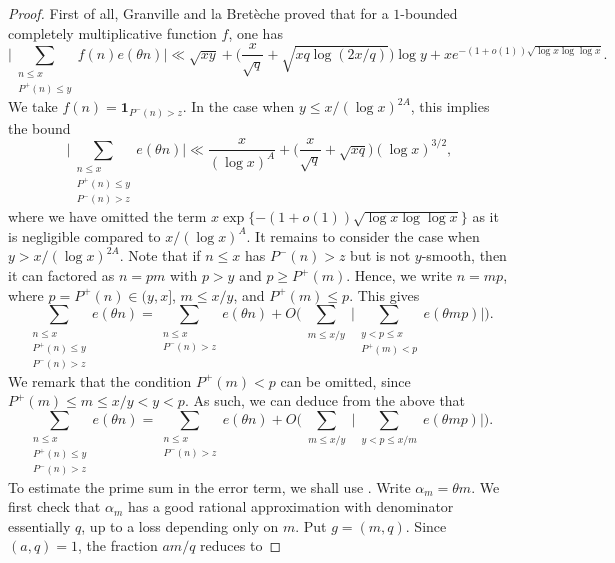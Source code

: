 \documentclass[12pt]{amsart}
\renewcommand{\le}{\leqslant}
\renewcommand{\leq}{\leqslant}
\renewcommand{\ge}{\geqslant}
\numberwithin{equation}{section}
\theoremstyle{plain}
\theoremstyle{definition}
\begin{document}
	\begin{proof}
		First of all, Granville and la Bret\`eche \cite[Equation 10.1]{granville breteche exp sums} proved that for a $1$-bounded completely multiplicative function $f$, one has
		$$\bigg|\sum_{\substack{n \leq x \\ P^+(n) \leq y}} f(n)e(\theta n)\bigg| \ll \sqrt{xy} + \bigg(\frac{x}{\sqrt{q}} + \sqrt{xq \log(2x/q)}\bigg)\log y + x e^{-(1+o(1))\sqrt{\log x  \log \log x}}.$$
		We take $f(n) = \bm{1}_{P^-(n) > z}$. In the case when $y \leq x/(\log x)^{2A}$, this implies the bound
		$$\bigg|\sum_{\substack{n \leq x \\ P^+(n) \leq y \\ P^-(n) > z}}e(\theta n)\bigg| \ll \frac{x}{(\log x)^{A}} + \bigg(\frac{x}{\sqrt{q}} + \sqrt{xq}\bigg)(\log x)^{3/2},$$
		where we have omitted the term $x\exp \{ -(1+o(1))\sqrt{\log x \log \log x}\}$ as it is negligible compared to $x/(\log x)^{A}$. It remains to consider the case when $y > x/(\log x)^{2A}$. Note that if $n\le x$ has $P^-(n)>z$ but is not $y$-smooth, then it can factored as $n=pm$ with $p>y$ and $p\ge P^+(m)$. Hence, we write $n = mp$, where $p = P^+(n) \in (y,x]$, $m \leq x/y$, and $P^+(m) \leq p$. This gives
		$$\sum_{\substack{n \leq x \\ P^+(n) \leq y \\ P^-(n) > z}}e(\theta n) =\sum_{\substack{n \leq x \\  P^-(n) > z}} e(\theta n) + O\bigg( \sum_{\substack{m \leq x/y}} \bigg| \sum_{\substack{y < p \leq x \\ P^+(m) < p}}e(\theta m p)\bigg|\bigg).$$ 
		We remark that the condition $P^+(m) < p$ can be omitted, since $P^+(m) \leq m \leq x/y < y < p$. As such, we can deduce from the above that
		\begin{equation}\label{eq: prime exp sum 1}
			\sum_{\substack{n \leq x \\ P^+(n) \leq y \\ P^-(n) > z}}e(\theta n) =\sum_{\substack{n \leq x \\  P^-(n) > z}} e(\theta n) + O\bigg( \sum_{\substack{m \leq x/y}} \bigg| \sum_{\substack{y < p \leq x/m}}e(\theta m p)\bigg|\bigg).
		\end{equation}
		To estimate the prime sum in the error term, we shall use . Write $\alpha_m = \theta m$. We first check that $\alpha_m$ has a good rational approximation with
		denominator essentially $q$, up to a loss depending only on $m$. Put
		$g=(m,q)$. Since $(a,q)=1$, the fraction $am/q$ reduces to

\end{proof}
\end{document}
